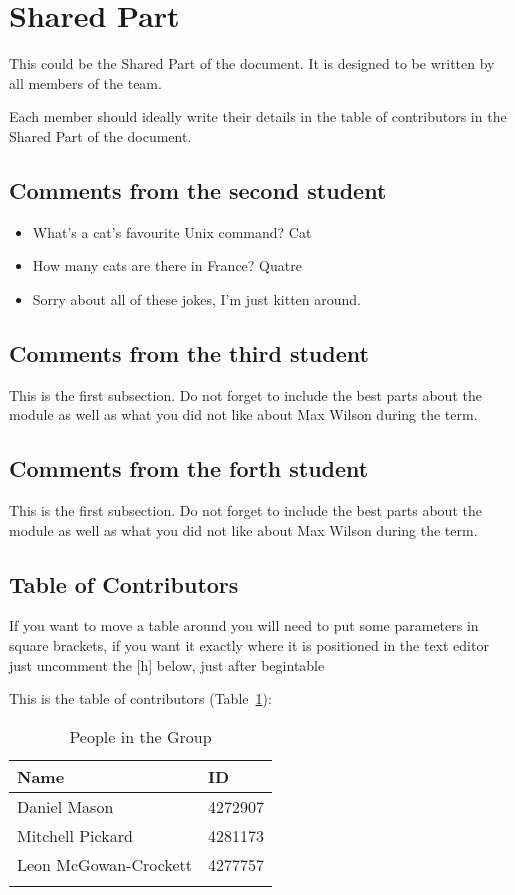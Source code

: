 \section{Shared Part}

This could be the Shared Part of the document. It is designed to be written by all members of the team.

Each member should ideally write their details in the table of contributors in the Shared Part of the document.


\subsection{Comments from the second student}

\begin{itemize}
	\item What's a cat's favourite Unix command? Cat

	\item How many cats are there in France? Quatre

	\item Sorry about all of these jokes, I'm just kitten around.
\end{itemize}

\subsection{Comments from the third student}
This is the first subsection. Do not forget to include the best parts about the module as well as what you did not like about Max Wilson during the term.

\subsection{Comments from the forth student}
This is the first subsection. Do not forget to include the best parts about the module as well as what you did not like about Max Wilson during the term.

\subsection{Table of Contributors}


If you want to move a table around you will need to put some parameters in square brackets, if you want it exactly where it is positioned in the text editor just uncomment the [h] below, just after begin{table}

This is the table of contributors (Table~\ref{authors}):
\begin{table}%
\centering
\caption{People in the Group}
\label{authors}
\begin{tabular}{|l|l|}
\hline
\textbf{Name} & \textbf{ID} \\
\hline
Daniel Mason & 4272907\\
\hline
Mitchell Pickard & 4281173\\
\hline
Leon McGowan-Crockett & 4277757\\
\hline
& \\
\hline
\end{tabular}
\end{table}